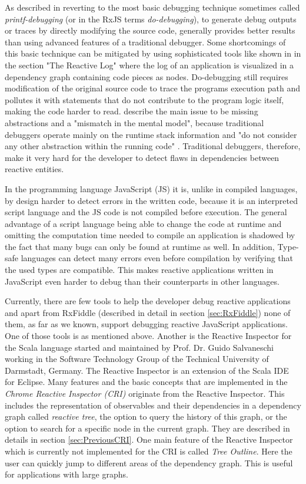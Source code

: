 As described in \cite{MSDN_DebugginObservables} reverting to the most basic debugging technique sometimes called \emph{printf-debugging} (or in the RxJS terms \emph{do-debugging}), to generate debug outputs or traces by directly modifying the source code, generally provides better results than using advanced features of a traditional debugger. Some shortcomings of this basic technique can be mitigated by using sophisticated tools like shown in \cite{ShinyGraphFromLog} in the section "The Reactive Log" where the log of an application is visualized in a dependency graph containing code pieces as nodes. Do-debugging still requires modification of the original source code to trace the programs execution path and pollutes it with statements that do not contribute to the program logic itself, making the code harder to read. \cite{PaperReactiveProgramming} describe the main issue to be missing abstractions and a "mismatch in the mental model", because traditional debuggers operate mainly on the runtime stack information and "do not consider any other abstraction within the running code" \cite{ThesisAbbas}. Traditional debuggers, therefore, make it very hard for the developer to detect flaws in dependencies between reactive entities.

In the programming language JavaScript (JS) it is, unlike in compiled languages, by design harder to detect errors in the written code, because it is an interpreted script language and the JS code is not compiled before execution. The general advantage of a script language being able to change the code at runtime and omitting the computation time needed to compile an application is shadowed by the fact that many bugs can only be found at runtime as well. In addition, Type-safe languages can detect many errors even before compilation by verifying that the used types are compatible. This makes reactive applications written in JavaScript even harder to debug than their counterparts in other languages.

Currently, there are few tools to help the developer debug reactive applications and apart from RxFiddle (described in detail in section \ref{sec:RxFiddle}) none of them, as far as we known, support debugging reactive JavaScript applications. One of those tools is \cite{ShinyGraphFromLog} as mentioned above. Another is the Reactive Inspector for the Scala language \cite{ReactiveInspector} started and maintained by Prof. Dr. Guido Salvaneschi working in the Software Technology Group of the Technical University of Darmstadt, Germany.
The Reactive Inspector is an extension of the Scala IDE for Eclipse. Many features and the basic concepts that are implemented in the \emph{Chrome Reactive Inspector (CRI)} originate from the Reactive Inspector. This includes the representation of observables and their dependencies in a dependency graph called \emph{reactive tree}, the option to query the history of this graph, or the option to search for a specific node in the current graph. They are described in details in section \ref{sec:PreviousCRI}. One main feature of the Reactive Inspector which is currently not implemented for the CRI is called \emph{Tree Outline}. Here the user can quickly jump to different areas of the dependency graph. This is useful for applications with large graphs.

